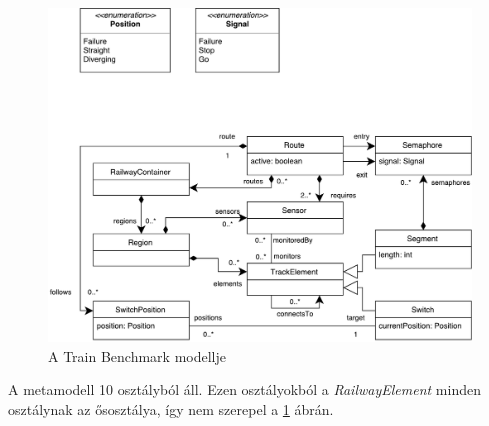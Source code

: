 \begin{figure}[H]
	\includegraphics[width=\linewidth, keepaspectratio]{figures/model.pdf}
	\caption{A Train Benchmark modellje}
	\label{fig:ModelDiagram}
\end{figure}

A metamodell 10 osztályból áll. Ezen osztályokból a \emph{RailwayElement} minden osztálynak az ősosztálya, így nem szerepel a \ref{fig:ModelDiagram} ábrán.

